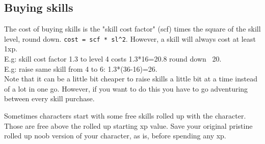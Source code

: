 

\subsection*{Buying skills}
The cost of buying skills is the "skill cost factor" (scf) times the square of the skill level, round down. \verb|cost = scf * sl^2|. However, a skill will always cost at least 1xp. \\
E.g: skill cost factor 1.3 to level 4 costs 1.3*16=20.8 round down ~20. \\
E.g: raise same skill from 4 to 6: 1.3*(36-16)=26. \\
Note that it can be a little bit cheaper to raise skills a little bit at a time instead of a lot in one go. However, if you want to do this you have to go adventuring between every skill purchase.

Sometimes characters start with some free skills rolled up with the character. Those are free above the rolled up starting xp value. Save your original pristine rolled up noob version of your character, as is, before spending any xp.






%
%


